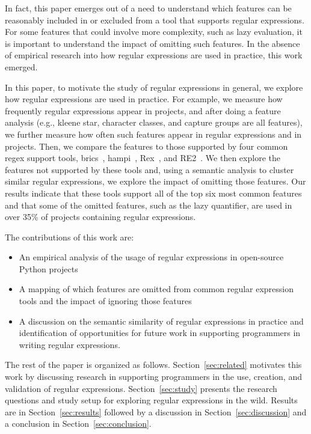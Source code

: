 In fact, this paper emerges out of a need to understand which features can be reasonably included in or excluded from a tool that supports regular expressions. For some features that could involve more complexity, such as lazy evaluation, it is important to understand the impact of omitting such features. In the absence of empirical research into how regular expressions are used in practice, this work emerged.

In this paper, to motivate the study of regular expressions in general, we explore how regular expressions are used in practice. For example, we measure how frequently regular expressions appear in projects, and after doing a feature analysis (e.g., kleene star, character classes, and capture groups are all features), we further measure how often such features appear in regular expressions and in projects. Then, we compare the features to those supported by four common regex support tools, brics~\cite{brics}, hampi~\cite{hampi}, Rex~\cite{rex}, and RE2~\cite{re2}. We then explore the features not supported by these tools and, using a semantic analysis to cluster similar regular expressions, we explore the impact of omitting those features. Our results indicate that these tools support all of the top six most common features and that some of the omitted features, such as the lazy quantifier, are used in over 35\% of projects containing regular expressions.

The contributions of this work are:

\begin{itemize}
	\item An empirical analysis of the usage of regular expressions in  open-source Python projects
	\item A mapping of which features are omitted from common regular expression tools and the impact of ignoring those features
	\item A discussion on the semantic similarity of regular expressions in practice and identification of opportunities for future work in supporting programmers in writing regular expressions.
\end{itemize}

The rest of the paper is organized as follows. Section~\ref{sec:related} motivates this work by discussing research in supporting programmers in the use, creation, and validation of regular expressions. Section~\ref{sec:study} presents the research questions and study setup for exploring regular expressions in the wild. Results are in Section~\ref{sec:results} followed by a discussion in Section~\ref{sec:discussion} and a conclusion in Section~\ref{sec:conclusion}.

